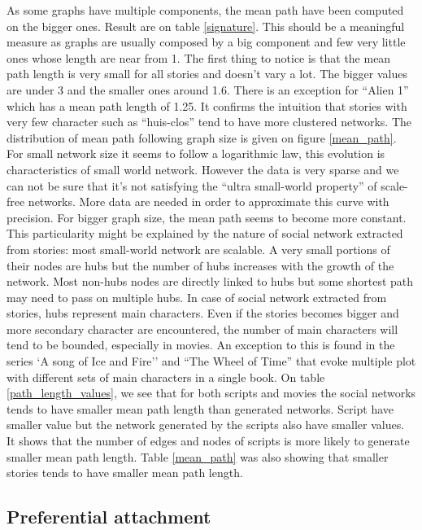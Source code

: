 \documentclass[a4paper, 12pt]{report}
\begin{document}
As some graphs have multiple components, the mean path have been computed on the bigger ones. Result are on table \ref{signature}. This should be a meaningful measure as graphs are usually composed by a big component and few very little ones whose length are near from 1. The first thing to notice is that the mean path length is very small for all stories and doesn't vary a lot. The bigger values are under 3 and the smaller ones around 1.6. There is an exception for ``Alien 1'' which has a mean path length of 1.25. It confirms the intuition that stories with very few character such as ``huis-clos'' tend to have more clustered networks. 
The distribution of mean path following graph size is given on figure \ref{mean_path}.
For small network size it seems to follow a logarithmic law, this evolution is characteristics of small world network. However the data is very sparse and we can not be sure that it's not satisfying the ``ultra small-world property'' of scale-free networks. More data are needed in order to approximate this curve with precision.
For bigger graph size, the mean path seems to become more constant. This particularity might be explained by the nature of social network extracted from stories: most small-world network are scalable. 
A very small portions of their nodes are hubs but the number of hubs increases with the growth of the network. Most non-hubs nodes are directly linked to hubs but some shortest path may need to pass on multiple hubs. 
In case of social network extracted from stories, hubs represent main characters.
Even if the stories becomes bigger and more secondary character are encountered, the number of main characters will tend to be bounded, especially in movies. 
An exception to this is found in the series `A song of Ice and Fire'' and ``The Wheel of Time'' that evoke multiple plot with different sets of main characters in a single book.
On table \ref{path_length_values}, we see that for both scripts and movies the social networks tends to have smaller mean path length than generated networks. Script have smaller value but the network generated by the scripts also have smaller values. It shows that the number of edges and nodes of scripts is more likely to generate smaller mean path length. Table \ref{mean_path} was also showing that smaller stories tends to have smaller mean path length.

\subsection{Preferential attachment}
\end{document}
